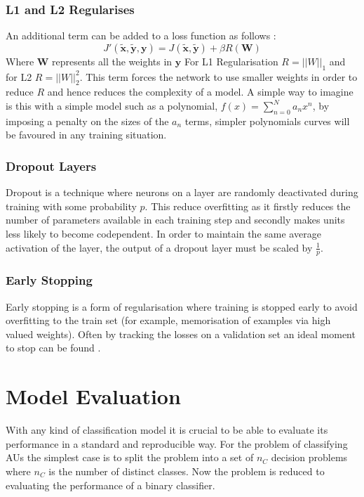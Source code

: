     \subsubsection{L1 and L2 Regularises}
      An additional term can be added to a loss function as follows \cite{Ng2004a}:
      \begin{equation}
        J'(\tilde{\mathbf{x}},\tilde{\mathbf{y}},\mathbf{y}) = J(\tilde{\mathbf{x}},\tilde{\mathbf{y}}) + \beta R(\mathbf{W})
      \end{equation}
      Where $\mathbf{W}$ represents all the weights in $\mathbf{y}$ For L1 Regularisation $R = ||W||_1$ and for L2 $R = ||W||_2^2$.
      This term forces the network to use smaller weights in order to reduce $R$
      and hence reduces the complexity of a model. A simple way to imagine is this
      with a simple model such as a polynomial, $f(x)=\sum_{n=0}^N a_n x^n$, by imposing a
      penalty on the sizes of the $a_n$ terms, simpler polynomials curves will be favoured in
      any training situation.
    \subsubsection{Dropout Layers} \label{sec:dropout}
      Dropout \cite{Srivastava2014} is a technique where neurons on a layer are
      randomly deactivated during training with some probability $p$. This reduce overfitting
      as it firstly reduces the number of parameters available in each training step and secondly
      makes units less likely to become codependent. In order to maintain the same average activation
      of the layer, the output of a dropout layer must be scaled by $\frac{1}{p}$.
    \subsubsection{Early Stopping}
      Early stopping is a form of regularisation where training is stopped early
      to avoid overfitting to the train set (for example, memorisation of examples via high valued weights).
      Often by tracking the losses on
      a validation set an ideal moment to stop can be found \cite{Prechelt2012a}.
\section{Model Evaluation} \label{sec:eval}
  With any kind of classification model it is crucial to be able to evaluate its
  performance in a standard and reproducible way. For the problem of classifying
  AUs the simplest case is to split the problem into a set of $n_C$ decision problems
  where $n_C$ is the number of distinct classes. Now the problem is reduced to
  evaluating the performance of a binary classifier.

